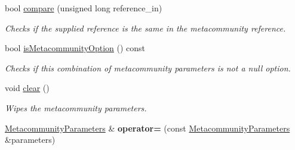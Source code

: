 \begin{DoxyCompactItemize}
bool \hyperlink{struct_metacommunity_parameters_a5b8597643984dd783a4275d93ce0b7cb}{compare} (unsigned long reference\+\_\+in)
\begin{DoxyCompactList}\small\item\em Checks if the supplied reference is the same in the metacommunity reference. \end{DoxyCompactList}\item 
bool \hyperlink{struct_metacommunity_parameters_a01d2874885c2bc6622d46c519156c7e3}{is\+Metacommunity\+Option} () const 
\begin{DoxyCompactList}\small\item\em Checks if this combination of metacommunity parameters is not a null option. \end{DoxyCompactList}\item 
void \hyperlink{struct_metacommunity_parameters_a6f74de64524f1e07ec001f11d21cf1f5}{clear} ()\hypertarget{struct_metacommunity_parameters_a6f74de64524f1e07ec001f11d21cf1f5}{}\label{struct_metacommunity_parameters_a6f74de64524f1e07ec001f11d21cf1f5}

\begin{DoxyCompactList}\small\item\em Wipes the metacommunity parameters. \end{DoxyCompactList}\item 
\hyperlink{struct_metacommunity_parameters}{Metacommunity\+Parameters} \& {\bfseries operator=} (const \hyperlink{struct_metacommunity_parameters}{Metacommunity\+Parameters} \&parameters)\hypertarget{struct_metacommunity_parameters_a198c799e7f0d1ae1a6a1ebd7ebcf42cb}{}\label{struct_metacommunity_parameters_a198c799e7f0d1ae1a6a1ebd7ebcf42cb}

\end{DoxyCompactItemize}
